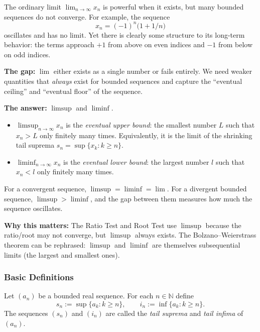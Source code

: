 \begin{remark*}
The ordinary limit $\lim_{n \to \infty} x_n$ is powerful when it exists, but many
bounded sequences do not converge.  For example, the sequence
\[
x_n = (-1)^n\bigl(1 + 1/n\bigr)
\]
oscillates and has no limit.  Yet there is clearly some structure to its
long-term behavior: the terms approach $+1$ from above on even indices and
$-1$ from below on odd indices.

\medskip

\textbf{The gap:} $\lim$ either exists as a single number or fails entirely.
We need weaker quantities that \emph{always} exist for bounded sequences and
capture the ``eventual ceiling'' and ``eventual floor'' of the sequence.

\medskip

\textbf{The answer:} $\limsup$ and $\liminf$.
\begin{itemize}
  \item $\limsup_{n \to \infty} x_n$ is the \emph{eventual upper bound}: the
        smallest number $L$ such that $x_n > L$ only finitely many times.
        Equivalently, it is the limit of the shrinking tail suprema
        $s_n = \sup\{x_k : k \ge n\}$.
  \item $\liminf_{n \to \infty} x_n$ is the \emph{eventual lower bound}: the
        largest number $l$ such that $x_n < l$ only finitely many times.
\end{itemize}

For a convergent sequence, $\limsup = \liminf = \lim$.
For a divergent bounded sequence, $\limsup > \liminf$, and the gap between
them measures how much the sequence oscillates.

\medskip

\textbf{Why this matters:} The Ratio Test and Root Test use $\limsup$
because the ratio/root may not converge, but $\limsup$ always exists.
The Bolzano--Weierstrass theorem can be rephrased: $\limsup$ and $\liminf$
are themselves subsequential limits (the largest and smallest ones).
\end{remark*}

\subsubsection{Basic Definitions}

\begin{tcolorbox}[colback=propbox, colframe=propborder, arc=2pt,
  left=6pt, right=6pt, top=4pt, bottom=4pt,
  title={\small\textbf{Definition (Tail supremum and infimum)}},
  fonttitle=\small\bfseries]
Let $(a_n)$ be a bounded real sequence. For each $n \in \mathbb{N}$ define
\[
s_n := \sup \{ a_k : k \ge n \},
\qquad
i_n := \inf \{ a_k : k \ge n \}.
\]
The sequences $(s_n)$ and $(i_n)$ are called the \emph{tail suprema} and 
\emph{tail infima} of $(a_n)$.
\end{tcolorbox}

